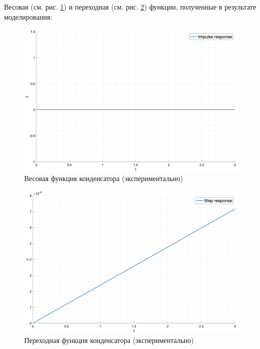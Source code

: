 Весовая (см. рис. \ref{fig:task3_impulse_response_exp}) и переходная (см. рис. \ref{fig:task3_step_response_exp}) функции, полученные в результате моделирования:
\begin{figure}[ht!]
    \centering
    \includegraphics[width=\textwidth]{media/plots/task3_impulse_response_exp.png}
    \caption{Весовая функция конденсатора (экспериментально)}
    \label{fig:task3_impulse_response_exp}
\end{figure}
\begin{figure}[ht!]
    \centering
    \includegraphics[width=\textwidth]{media/plots/task3_step_response_exp.png}
    \caption{Переходная функция конденсатора (экспериментально)}
    \label{fig:task3_step_response_exp}
\end{figure}

